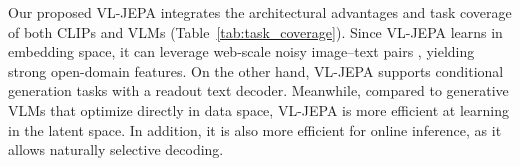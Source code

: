 



\begin{table}[h!]
    \centering
    \caption{Task coverage comparison.}
    \label{tab:task_coverage}
\end{table}

Our proposed VL-JEPA integrates the architectural advantages and task coverage of both CLIPs and VLMs (Table~\ref{tab:task_coverage}). Since VL-JEPA learns in embedding space, it can leverage web-scale noisy image–text pairs \citep{jia2021scaling}, yielding strong open-domain features. On the other hand, VL-JEPA supports conditional generation tasks with a readout text decoder. Meanwhile, compared to generative VLMs that optimize directly in data space, VL-JEPA is more efficient at learning in the latent space. In addition, it is also more efficient for online inference, as it allows naturally selective decoding.


